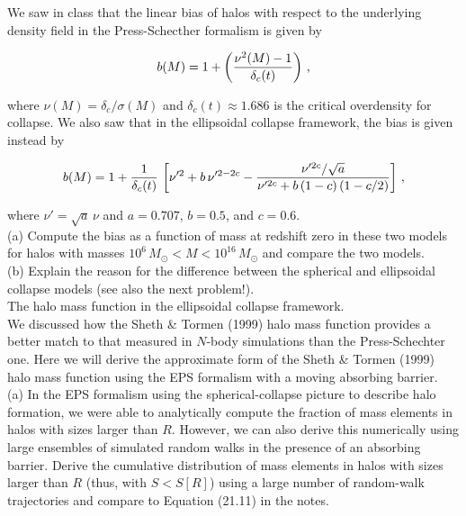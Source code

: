 \documentclass[12pt]{article}
\begin{document}
We saw in class that the linear bias of halos with respect to the underlying density field in the Press-Schecther formalism is given by

\begin{equation}
    b(M) = 1+\left({\nu^2(M)-1\over \delta_c(t)}\right)\,,
\end{equation}

where $\nu(M) = \delta_c/\sigma(M)$ and $\delta_c(t) \approx 1.686$ is the critical overdensity for collapse. We also saw that in the ellipsoidal collapse framework, the bias is given instead by

\begin{equation}
    b(M) = 1+{1\over \delta_c(t)}\,\left[\nu'^2 + b\,\nu'^{2-2c}-{\nu'^{2c}/\sqrt{a}\over \nu'^{2c}+b\,(1-c)\,(1-c/2)}\right]\,,
\end{equation}

where $\nu' = \sqrt{a}\,\nu$ and $a = 0.707$, $b=0.5$, and $c=0.6$.\\

(a) Compute the bias as a function of mass at redshift zero in these two models for halos with masses $10^6\,M_\odot < M < 10^{16}\,M_\odot$ and compare the two models.\\

(b) Explain the reason for the difference between the spherical and ellipsoidal collapse models (see also the next problem!).\\

 The halo mass function in the ellipsoidal collapse framework.\\

We discussed how the Sheth \& Tormen (1999) halo mass function provides a better match to that measured in $N$-body simulations than the Press-Schechter one. Here we will derive the approximate form of the Sheth \& Tormen (1999) halo mass function using the EPS formalism with a moving absorbing barrier.\\
    
(a) In the EPS formalism using the spherical-collapse picture to describe halo formation, we were able to analytically compute the fraction of mass elements in halos with sizes larger than $R$. However, we can also derive this numerically using large ensembles of simulated random walks in the presence of an absorbing barrier. Derive the cumulative distribution of mass elements in halos with sizes larger than $R$ (thus, with $S < S[R]$) using a large number of random-walk trajectories and compare to Equation (21.11) in the notes.\\
      
\end{document}
